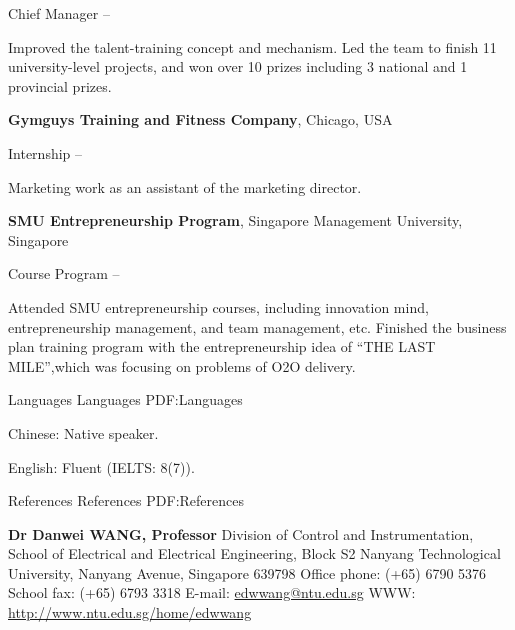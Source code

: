 \documentclass[letterpaper,MMMyyyy,nonstopmode]{simpleresumecv}
\begin{document}
\begin{Body}
\BulletItem
Chief Manager
\hfill
{} --
\begin{Detail}
\SubBulletItem
Improved the talent-training concept and mechanism.
\SubBulletItem
Led the team to finish 11 university-level projects, and won over 10 prizes including 3 national
 and 1 provincial prizes.
\end{Detail}

\Gap
{\textbf{Gymguys Training and Fitness Company}},
Chicago, 
USA

\BulletItem
Internship
\hfill
{} --
\begin{Detail}
	\SubBulletItem
	Marketing work as an assistant of the marketing director.
\end{Detail}

\Gap
{\textbf{SMU Entrepreneurship Program}},
Singapore Management University,
Singapore

\BulletItem
Course Program
\hfill
{} --
\begin{Detail}
\SubBulletItem
Attended SMU entrepreneurship courses, including innovation mind, entrepreneurship management, and team management, etc.
\SubBulletItem
Finished the business plan training program with the entrepreneurship idea of “THE LAST MILE”,which was focusing on problems of O2O delivery.
\end{Detail}



\Section
{Languages}
{Languages}
{PDF:Languages}

\BulletItem
Chinese: Native speaker.

\Gap
\BulletItem
English: Fluent (IELTS: 8(7)).



\Section
{References}
{References}
{PDF:References}

\Gap
\BulletItem
\textbf{Dr Danwei WANG, Professor}
\newline
Division of Control and Instrumentation,
School of Electrical and Electrical Engineering, Block S2
\newline
Nanyang Technological University,
Nanyang Avenue, Singapore 639798
\newline
Office phone: (+65) 6790 5376
\newline
School fax: (+65) 6793 3318
\newline
E-mail: \url{edwwang@ntu.edu.sg}
\newline
WWW: \url{http://www.ntu.edu.sg/home/edwwang}



\end{Body}
\end{document}
